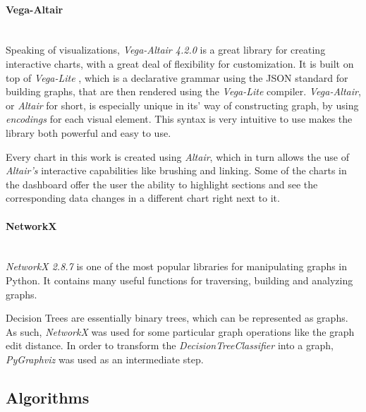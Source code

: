 \documentclass[a4paper, 12pt]{article}
\begin{document}
\paragraph{Vega-Altair}\mbox{}\\
Speaking of visualizations, \textit{Vega-Altair 4.2.0} \cite{VanderPlas2018} is a great library for
creating interactive charts, with a great deal of flexibility for customization. It is built
on top of \textit{Vega-Lite} \cite{Satyanarayan2017}, which is a declarative grammar using
the JSON standard for building graphs, that are then rendered using the \textit{Vega-Lite}
compiler. \textit{Vega-Altair}, or \textit{Altair} for short, is especially unique in its'
way of constructing graph, by using \textit{encodings} for each visual element. This syntax
is very intuitive to use makes the library both powerful and easy to use. \par
Every chart in this work is created using \textit{Altair}, which in turn allows the use of
\textit{Altair's} interactive capabilities like brushing and linking. Some of the charts in the
dashboard offer the user the ability to highlight sections and see the corresponding data changes
in a different chart right next to it.

\paragraph{NetworkX}\mbox{}\\
\textit{NetworkX 2.8.7} \cite{SciPyProceedings_11} is one of the most popular libraries for
manipulating graphs in Python. It contains many useful functions for traversing, building
and analyzing graphs. \par
Decision Trees are essentially binary trees, which can be represented as graphs. As such,
\textit{NetworkX} was used for some particular graph operations like the graph edit distance.
In order to transform the \textit{DecisionTreeClassifier} into a graph, \textit{PyGraphviz}
was used as an intermediate step.

\subsection{Algorithms}
\end{document}
